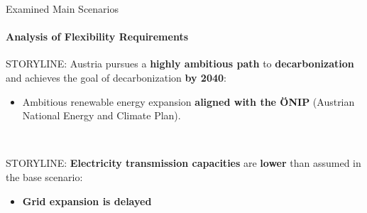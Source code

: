 \documentclass[aspectratio=169]{beamer}
\begin{document}
\begin{frame}{Examined Main Scenarios}
    \framesubtitle{Analysis of Flexibility Requirements}

    \vspace{-0.8cm}
    \begin{minipage}[t][12.9cm]{\textwidth}
        \begin{minipage}[t]{0.325\textwidth}
            \begin{coloredblock}
                \begin{minipage}[t][3cm]{0.9\textwidth} 
                    \scriptsize STORYLINE: Austria pursues a \textbf{highly ambitious path} to \textbf{decarbonization} and achieves the goal of decarbonization \textbf{by 2040}:
                \end{minipage}
                \begin{minipage}[t][2.5cm]{0.9\textwidth}
                    \begin{itemize}
                        \item \scriptsize Ambitious renewable energy expansion \textbf{aligned with the ÖNIP} (Austrian National Energy and Climate Plan).
                    \end{itemize}
                \end{minipage}
                \begin{minipage}[t][3.7cm]{0.9\textwidth} 
                    \scriptsize ~
                \end{minipage}
            \end{coloredblock}
        \end{minipage}
        \hfill
        \begin{minipage}[t]{0.325\textwidth}
            \begin{coloredblock}
                \begin{minipage}[t][3cm]{0.9\textwidth} 
                    \scriptsize STORYLINE: \textbf{Electricity transmission capacities} are \textbf{lower} than assumed in the base scenario:
                \end{minipage}
                \begin{minipage}[t][2.5cm]{0.9\textwidth}
                    \begin{itemize}
                        \item \scriptsize \textbf{Grid expansion is delayed}

\end{itemize}
\end{minipage}
\end{coloredblock}
\end{minipage}
\end{minipage}
\end{frame}
\end{document}
